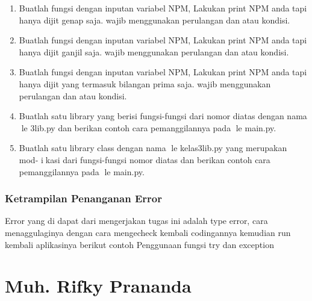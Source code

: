 \begin{enumerate}
    \item Buatlah fungsi dengan inputan variabel NPM, Lakukan print NPM anda tapi
    hanya dijit genap saja. wajib menggunakan perulangan dan atau kondisi.
    

    \item Buatlah fungsi dengan inputan variabel NPM, Lakukan print NPM anda tapi
    hanya dijit ganjil saja. wajib menggunakan perulangan dan atau kondisi.
    

    \item Buatlah fungsi dengan inputan variabel NPM, Lakukan print NPM anda tapi
    hanya dijit yang termasuk bilangan prima saja. wajib menggunakan perulangan
    dan atau kondisi.
    

    \item Buatlah satu library yang berisi fungsi-fungsi dari nomor diatas dengan nama
    le 3lib.py dan berikan contoh cara pemanggilannya pada le main.py.
    

    \item Buatlah satu library class dengan nama le kelas3lib.py yang merupakan mod-
    ikasi dari fungsi-fungsi nomor diatas dan berikan contoh cara pemanggilannya
    pada le main.py.
    
    
\end{enumerate}
\subsubsection{Ketrampilan Penanganan Error}
Error yang di dapat dari mengerjakan tugas ini adalah type error, cara menaggulaginya dengan cara mengecheck kembali codingannya
kemudian run kembali aplikasinya
berikut contoh Penggunaan fungsi try dan exception


\section{Muh. Rifky Prananda}
